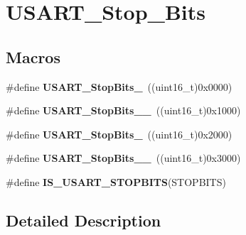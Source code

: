 \hypertarget{group___u_s_a_r_t___stop___bits}{\section{U\-S\-A\-R\-T\-\_\-\-Stop\-\_\-\-Bits}
\label{group___u_s_a_r_t___stop___bits}
}
\subsection*{Macros}
\begin{DoxyCompactItemize}
\item 
\hypertarget{group___u_s_a_r_t___stop___bits_gae2cb35620ba001f0d63e9e0be93e4a05}{\#define {\bfseries U\-S\-A\-R\-T\-\_\-\-Stop\-Bits\-\_}~((uint16\-\_\-t)0x0000)}\label{group___u_s_a_r_t___stop___bits_gae2cb35620ba001f0d63e9e0be93e4a05}

\item 
\hypertarget{group___u_s_a_r_t___stop___bits_ga2ad06e3acfb691735d05ab9a314e2e32}{\#define {\bfseries U\-S\-A\-R\-T\-\_\-\-Stop\-Bits\-\_\-\_}~((uint16\-\_\-t)0x1000)}\label{group___u_s_a_r_t___stop___bits_ga2ad06e3acfb691735d05ab9a314e2e32}

\item 
\hypertarget{group___u_s_a_r_t___stop___bits_ga652058b6be2f48ac0d82d0e75537fc81}{\#define {\bfseries U\-S\-A\-R\-T\-\_\-\-Stop\-Bits\-\_}~((uint16\-\_\-t)0x2000)}\label{group___u_s_a_r_t___stop___bits_ga652058b6be2f48ac0d82d0e75537fc81}

\item 
\hypertarget{group___u_s_a_r_t___stop___bits_ga30897cc46d5b3790a9b14ffaba354527}{\#define {\bfseries U\-S\-A\-R\-T\-\_\-\-Stop\-Bits\-\_\-\_}~((uint16\-\_\-t)0x3000)}\label{group___u_s_a_r_t___stop___bits_ga30897cc46d5b3790a9b14ffaba354527}

\item 
\#define {\bfseries I\-S\-\_\-\-U\-S\-A\-R\-T\-\_\-\-S\-T\-O\-P\-B\-I\-T\-S}(S\-T\-O\-P\-B\-I\-T\-S)
\end{DoxyCompactItemize}


\subsection{Detailed Description}


